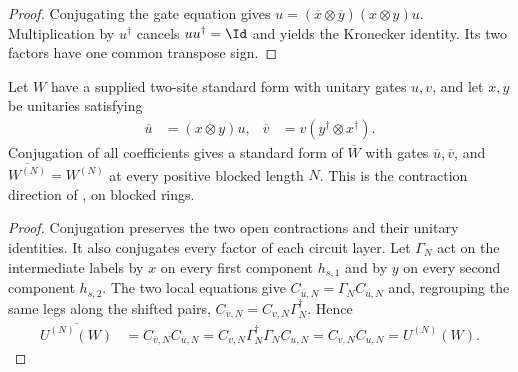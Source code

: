 \begin{proof}
    \leanok
    Conjugating the gate equation gives
    $u=(\overline x\otimes\overline y)(x\otimes y)u$.
    Multiplication by $u^\dagger$ cancels $uu^\dagger=\Id$ and yields the
    Kronecker identity. Its two factors have one common transpose sign.
\end{proof}

\begin{lemma}
    \label{lem:mpu_local_conjugation_contract}
    \leanok
    Let $W$ have a supplied two-site standard form with unitary gates $u,v$,
    and let $x,y$ be unitaries satisfying
    \begin{align}
        \overline u & =(x\otimes y)u,                 &
        \overline v & =v(y^\dagger\otimes x^\dagger).
    \end{align}
    Conjugation of all coefficients gives a standard form of $\overline W$
    with gates $\overline u,\overline v$, and
    $\overline{W^{(N)}}=W^{(N)}$ at every positive blocked length $N$.
    This is the contraction direction of
    \cite[Proposition~V.1, lines~1029--1030]{Cirac2017MPU}, on blocked rings.
\end{lemma}

\begin{proof}
    \leanok
    Conjugation preserves the two open contractions and their unitary
    identities. It also conjugates every factor of each circuit layer.
    Let $\Gamma_N$ act on the intermediate labels by $x$ on every first
    component $h_{s,1}$ and by $y$ on every second component $h_{s,2}$.
    The two local equations give $C_{\overline u,N}=\Gamma_NC_{u,N}$ and,
    regrouping the same legs along the shifted pairs,
    $C_{\overline v,N}=C_{v,N}\Gamma_N^\dagger$. Hence
    \begin{align}
        \overline{U^{(N)}(W)}
         & =C_{\overline v,N}C_{\overline u,N}
        =C_{v,N}\Gamma_N^\dagger\Gamma_NC_{u,N}
        =C_{v,N}C_{u,N}
        =U^{(N)}(W).
        \label{eq:mpu_local_conjugation_contract_circuit}
    \end{align}
\end{proof}

